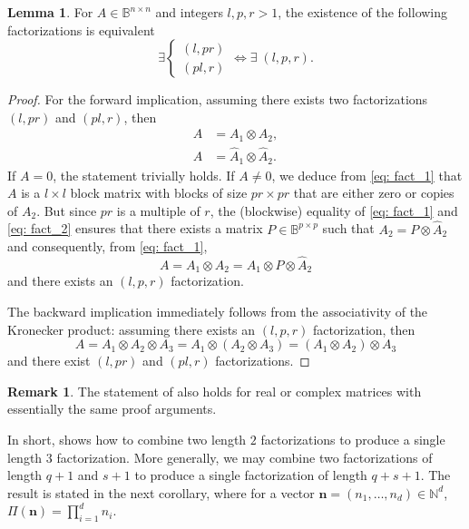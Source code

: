 \documentclass{article}
\numberwithin{equation}{section}
\theoremstyle{definition}
\newtheorem{remark}[definition]{Remark}
\newtheorem{lemma}[definition]{Lemma}
\begin{document}
\begin{lemma}
\label{lem: 2fact_2_to_1fact_3}
For $A \in \mathbb{B}^{n \times n}$ and integers $l,p,r>1$, the existence of the following factorizations is equivalent
\begin{equation*}
    \exists
    \begin{cases}
        (l,pr) \\
        (pl,r)
    \end{cases}
    \iff \exists \; (l,p,r).
\end{equation*}
\end{lemma}
\begin{proof}
For the forward implication, assuming there exists two factorizations $(l,pr)$ and $(pl,r)$, then
\begin{align}
    A &= A_1 \otimes A_2, \label{eq: fact_1} \\
    A &= \hat{A}_1 \otimes \hat{A}_2. \label{eq: fact_2}
\end{align}
If $A=0$, the statement trivially holds. If $A \neq 0$, we deduce from \eqref{eq: fact_1} that $A$ is a $l \times l$ block matrix with blocks of size $pr \times pr$ that are either zero or copies of $A_2$. But since $pr$ is a multiple of $r$, the (blockwise) equality of \eqref{eq: fact_1} and \eqref{eq: fact_2} ensures that there exists a matrix $P \in \mathbb{B}^{p \times p}$ such that $A_2 = P \otimes \hat{A}_2$ and consequently, from \eqref{eq: fact_1},
\begin{equation*}
    A = A_1 \otimes A_2 = A_1 \otimes P \otimes \hat{A}_2
\end{equation*}
and there exists an $(l,p,r)$ factorization.

The backward implication immediately follows from the associativity of the Kronecker product: assuming there exists an $(l,p,r)$ factorization, then
\begin{equation*}
    A = A_1 \otimes A_2 \otimes A_3 = A_1 \otimes (A_2 \otimes A_3) = (A_1 \otimes A_2) \otimes A_3
\end{equation*}
and there exist $(l,pr)$ and $(pl,r)$ factorizations.
\end{proof}

\begin{remark}
The statement of  also holds for real or complex matrices with essentially the same proof arguments.     
\end{remark}

In short,  shows how to combine two length $2$ factorizations to produce a single length $3$ factorization. More generally, we may combine two factorizations of length $q+1$ and $s+1$ to produce a single factorization of length $q+s+1$. The result is stated in the next corollary, where for a vector $\bm{n}=(n_1,\dots,n_d) \in \mathbb{N}^d$, $\Pi(\bm{n})=\prod_{i=1}^d n_i$.
\end{document}

